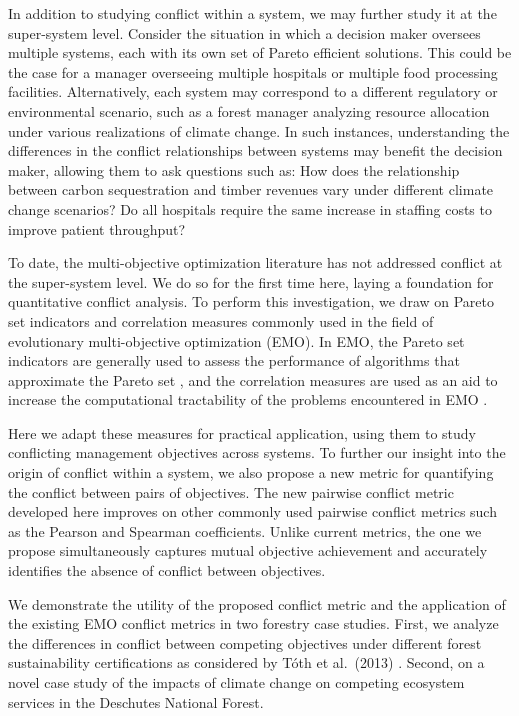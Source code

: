 In addition to studying conflict within a system, we may further study it at the super-system level. Consider the situation in which a decision maker oversees multiple systems, each with its own set of Pareto efficient solutions. This could be the case for a manager overseeing multiple hospitals or multiple food processing facilities. Alternatively, each system may correspond to a different regulatory or environmental scenario, such as a forest manager analyzing resource allocation under various realizations of climate change. In such instances, understanding the differences in the conflict relationships between systems may benefit the decision maker, allowing them to ask questions such as: How does the relationship between carbon sequestration and timber revenues vary under different climate change scenarios? Do all hospitals require the same increase in staffing costs to improve patient throughput?

To date, the multi-objective optimization literature has not addressed conflict at the super-system level. We do so for the first time here, laying a foundation for quantitative conflict analysis. To perform this investigation, we draw on Pareto set indicators and correlation measures commonly used in the field of evolutionary multi-objective optimization (EMO). In EMO, the Pareto set indicators are generally used to assess the performance of algorithms that approximate the Pareto set \cite{zitzler2003performance}, and the correlation measures are used as an aid to increase the computational tractability of the problems encountered in EMO \cite{brockhoff2006all}.

Here we adapt these measures for practical application, using them to study conflicting management objectives across systems. To further our insight into the origin of conflict within a system, we also propose a new metric for quantifying the conflict between pairs of objectives. The new pairwise conflict metric developed here improves on other commonly used pairwise conflict metrics such as the Pearson and Spearman coefficients. Unlike current metrics, the one we propose simultaneously captures mutual objective achievement and accurately identifies the absence of conflict between objectives.

We demonstrate the utility of the proposed conflict metric and the application of the existing EMO conflict metrics in two forestry case studies. First, we analyze the differences in conflict between competing objectives under different forest sustainability certifications as considered by T{\'o}th et al.\ (2013) \cite{toth2013ecosel}. Second, on a novel case study of the impacts of climate change on competing ecosystem services in the Deschutes National Forest.


